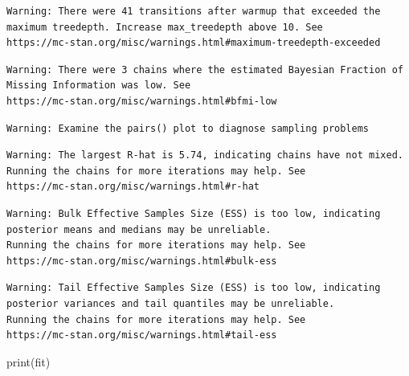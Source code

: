 \documentclass[
  12pt,
]{article}
\newenvironment{Shaded}{\begin{snugshade}}{\end{snugshade}}
\newcommand{\FunctionTok}[1]{\textcolor[rgb]{0.28,0.35,0.67}{#1}}
\newcommand{\NormalTok}[1]{\textcolor[rgb]{0.00,0.23,0.31}{#1}}
\begin{document}
\begin{verbatim}
Warning: There were 41 transitions after warmup that exceeded the maximum treedepth. Increase max_treedepth above 10. See
https://mc-stan.org/misc/warnings.html#maximum-treedepth-exceeded
\end{verbatim}

\begin{verbatim}
Warning: There were 3 chains where the estimated Bayesian Fraction of Missing Information was low. See
https://mc-stan.org/misc/warnings.html#bfmi-low
\end{verbatim}

\begin{verbatim}
Warning: Examine the pairs() plot to diagnose sampling problems
\end{verbatim}

\begin{verbatim}
Warning: The largest R-hat is 5.74, indicating chains have not mixed.
Running the chains for more iterations may help. See
https://mc-stan.org/misc/warnings.html#r-hat
\end{verbatim}

\begin{verbatim}
Warning: Bulk Effective Samples Size (ESS) is too low, indicating posterior means and medians may be unreliable.
Running the chains for more iterations may help. See
https://mc-stan.org/misc/warnings.html#bulk-ess
\end{verbatim}

\begin{verbatim}
Warning: Tail Effective Samples Size (ESS) is too low, indicating posterior variances and tail quantiles may be unreliable.
Running the chains for more iterations may help. See
https://mc-stan.org/misc/warnings.html#tail-ess
\end{verbatim}

\begin{Shaded}
\begin{Highlighting}[]
\FunctionTok{print}\NormalTok{(fit)}
\end{Highlighting}
\end{Shaded}
\end{document}
